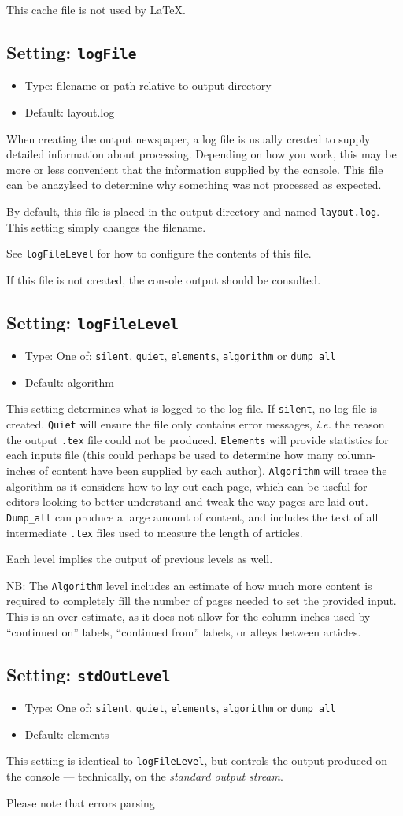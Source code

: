 \documentclass[a4paper,DIV=11]{scrartcl}
\newcommand{\property}[5]{
  \subsection{#1: \texttt{#2}}
  \begin{itemize}
  \item Type: #3
  \item Default: #4
  \end{itemize}
  #5
}
\newcommand{\setting}{\property{Setting}}
\begin{document}
\begin{multicols}{2}
{  This cache file is not used by \LaTeX.
 }
\setting{logFile}{filename or path relative to output directory}{layout.log}{
  When creating the output newspaper, a log file is usually created to
  supply detailed information about processing. Depending on how you
  work, this may be more or less convenient that the information
  supplied by the console. This file can be anazylsed to determine why
  something was not processed as expected.\par By default, this file
  is placed in the output directory and named
  \texttt{layout.log}. This setting simply changes the filename.\par
  See \texttt{logFileLevel} for how to configure the contents of this
  file.\par If this file is not created, the console output should be consulted.
}
\setting{logFileLevel}{One of: \texttt{silent}, \texttt{quiet}, \texttt{elements},
  \texttt{algorithm} or \texttt{dump\_all}}{algorithm}{
  This setting determines what is logged to the log file. If
  \texttt{silent}, no log file is created. \texttt{Quiet} will ensure
  the file only contains error messages, \textit{i.e.} the reason the
  output \texttt{.tex} file could not be produced. \texttt{Elements}
  will provide statistics for each inputs file (this could perhaps be used to
  determine how many column-inches of content have been supplied by
  each author). \texttt{Algorithm} will trace the algorithm as it
  considers how to lay out each page, which can be useful for editors
  looking to better understand and tweak the
  way pages are laid out. \texttt{Dump\_all} can produce a large amount of content,
  and includes the text of all intermediate \texttt{.tex} files used
  to measure the length of articles.
  \par
  Each level implies the output of previous levels as well.
  \par
  NB: The \texttt{Algorithm} level includes an estimate of how much
  more content is required to completely fill the number of pages
  needed to set the provided input. This is an over-estimate, as
  it does not allow for the column-inches used by ``continued on'' labels,
  ``continued from'' labels, or alleys between articles.
}
\setting{stdOutLevel}{One of: \texttt{silent}, \texttt{quiet}, \texttt{elements},
  \texttt{algorithm} or \texttt{dump\_all}}{elements}{
  This setting is identical to \texttt{logFileLevel}, but controls the
  output produced on the console --- technically, on the
  \textit{standard output stream}.\par Please note that errors parsing
}
\end{multicols}
\end{document}
